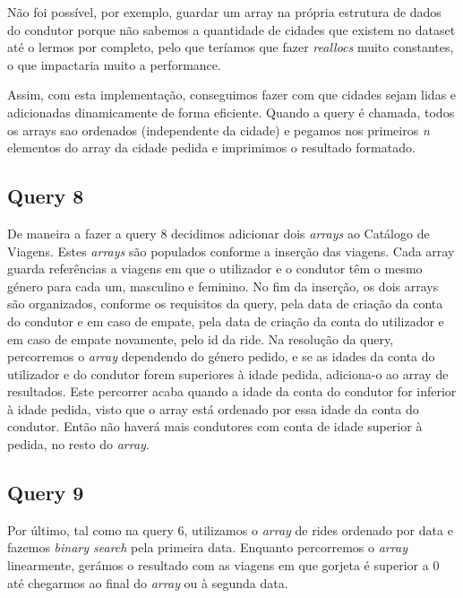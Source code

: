 \documentclass{article}
\begin{document}
            Não foi possível, por exemplo, guardar um array na própria estrutura de dados do condutor
            porque não sabemos a quantidade de cidades que existem no dataset até o lermos por completo,
            pelo que teríamos que fazer \emph{reallocs} muito constantes, o que impactaria muito a performance.

            Assim, com esta implementação, conseguimos fazer com que cidades sejam lidas e adicionadas dinamicamente
            de forma eficiente.
            Quando a query é chamada, todos os arrays sao ordenados (independente da cidade) e
            pegamos nos primeiros \emph{n} elementos do array da cidade pedida e imprimimos o resultado formatado.
        \subsection{Query 8}
			De maneira a fazer a query 8 decidimos adicionar dois \textit{arrays} ao Catálogo de Viagens. Estes \textit{arrays} são populados conforme a inserção das viagens. 
            Cada array guarda referências a viagens em que
            o utilizador e o condutor têm o mesmo género para cada um, masculino e feminino. No fim da inserção, os dois
            arrays são organizados, conforme os requisitos da query, pela data de criação da conta do condutor e em caso 
            de empate, pela data de criação da conta do utilizador e em caso de empate novamente, pelo id da ride.
            Na resolução da query, percorremos o \textit{array} dependendo do género pedido, e se as idades
            da conta do utilizador e do condutor forem superiores à idade pedida, adiciona-o ao array de resultados.
            Este percorrer acaba quando a idade da conta do condutor for inferior à idade pedida, visto que
            o array está ordenado por essa idade da conta do condutor. Então não haverá mais condutores 
            com conta de idade superior à pedida, no resto do \textit{array}.
            
        \subsection{Query 9}
            Por último, tal como na query 6, utilizamos o \emph{array} de rides ordenado por data e fazemos
            \textit{binary search} pela primeira data. Enquanto percorremos o \emph{array} linearmente, gerámos o resultado com
            as viagens em que gorjeta é superior a 0 até chegarmos ao final do \textit{array} ou à segunda data.
\end{document}
